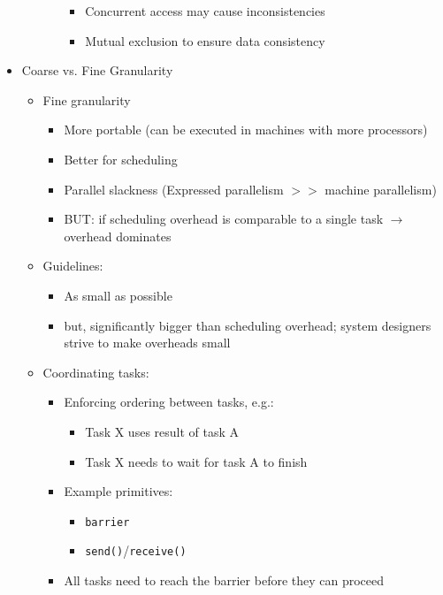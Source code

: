 \documentclass[a4paper]{article}
\newcommand{\inline}[1]{\lstinline!#1!}%
\begin{document}
\begin{itemize}
\begin{itemize}
\begin{itemize}
\begin{itemize}
\item Concurrent access may cause inconsistencies
\item Mutual exclusion to ensure data consistency
\end{itemize}
\end{itemize}
\end{itemize}
\item Coarse vs. Fine Granularity
\begin{itemize}
\item Fine granularity
\begin{itemize}
\item More portable (can be executed in machines with more processors)
\item Better for scheduling 
\item Parallel slackness (Expressed parallelism $>>$ machine parallelism)
\item BUT: if scheduling overhead is comparable to a single task $\to$ overhead dominates
\end{itemize}
\item Guidelines:
\begin{itemize}
\item As small as possible
\item but, significantly bigger than scheduling overhead; system designers strive to make overheads small
\end{itemize}
\item Coordinating tasks:
\begin{itemize}
\item Enforcing ordering between tasks, e.g.:
\begin{itemize}
\item Task X uses result of task A
\item Task X needs to wait for task A to finish
\end{itemize}
\item Example primitives:
\begin{itemize}
\item \inline{barrier}
\item \inline{send()}/\inline{receive()}
\end{itemize}
\item All tasks need to reach the barrier before they can proceed
\end{itemize}
\end{itemize}
\end{itemize}
\end{document}
